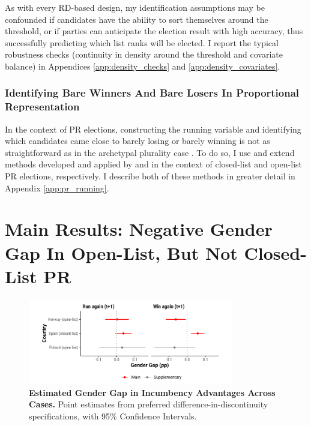 \documentclass[12pt]{article}
\begin{document}
As with every RD-based design, my identification assumptions may be confounded if candidates have the ability to sort themselves around the threshold, or if parties can anticipate the election result with high accuracy, thus successfully predicting which list ranks will be elected. I report the typical robustness checks (continuity in density around the threshold and covariate balance) in Appendices \ref{app:density_checks} and  \ref{app:density_covariates}.

\subsubsection{Identifying Bare Winners And Bare Losers In Proportional Representation}

In the context of PR elections, constructing the running variable and identifying which candidates came close to barely losing or barely winning is not as straightforward as in the archetypal plurality case \citep{lee2001a,lee2008, fiva2016,fiva2018b}. To do so, I use and extend methods developed and applied by \citet{folke2014} and \citet{fiva2018a} in the context of closed-list and open-list PR elections, respectively. I describe both of these methods in greater detail in Appendix \ref{app:pr_running}.


\section{Main Results: Negative Gender Gap In Open-List, But Not Closed-List PR}

\begin{figure}[htbp]
    \centering
    \includegraphics[width = 0.8\textwidth]{../output/figures/coef_summary.pdf}
    \caption{\textbf{Estimated Gender Gap in Incumbency Advantages Across Cases.} Point estimates from preferred difference-in-discontinuity specifications, with 95\% Confidence Intervals.}
    \label{fig:coef_summary}
\end{figure}
\end{document}
